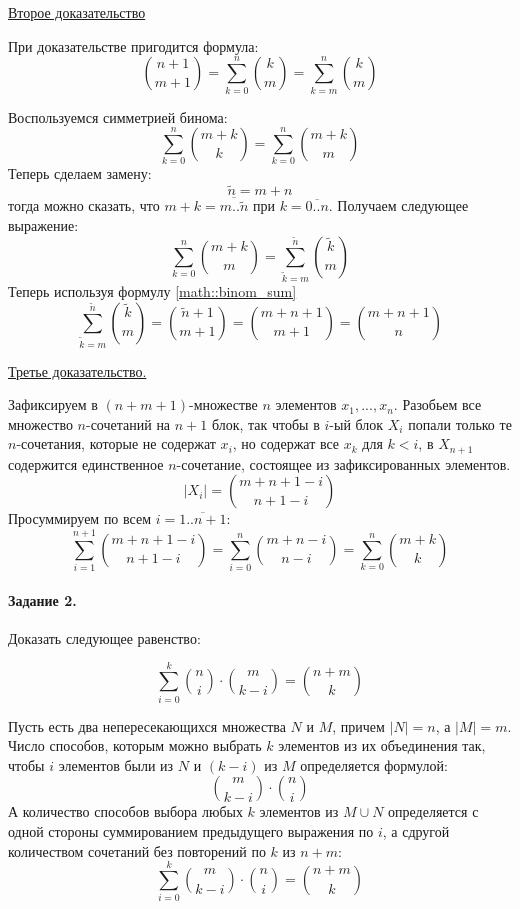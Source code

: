 \documentclass[a4paper,12pt]{article}
\begin{document}
\underline{Второе доказательство}

\begin{Proof}
	При доказательстве пригодится формула:
	\begin{equation}
		\binom{n+1}{m+1} = \sum_{k=0}^n \binom{k}{m} = \sum_{k=m}^{n} \binom{k}{m}
		\label{math::binom_sum}
	\end{equation}

	Воспользуемся симметрией бинома:
	\[
		\sum_{k=0}^n \binom{m+k}{k} = \sum_{k=0}^n \binom{m+k}{m}
	\]
	Теперь сделаем замену:
	\[\tilde n = m + n\] тогда можно сказать, что $m+k = \overline{m .. \tilde n}$ при $k = \overline{0 .. n}$. Получаем следующее выражение:
	\[
		\sum_{k=0}^n \binom{m+k}{m} = \sum_{\tilde k=m}^{\tilde n} \binom{\tilde k}{m}
	\]
	Теперь используя формулу \ref{math::binom_sum}
	\[
		\sum_{\tilde k=m}^{\tilde n} \binom{\tilde k}{m} = \binom{\tilde n + 1}{m + 1} = \binom{m + n + 1}{m + 1} = \binom{m+n+1}{n}
	\]
\end{Proof}

\underline{Третье доказательство.}

\begin{Proof}
	Зафиксируем в $(n+m+1)$-множестве $n$ элементов $x_1, ... , x_n$. Разобьем все множество $n$-сочетаний на $n+1$ блок, так чтобы в $i$-ый блок $X_i$ попали только те $n$-сочетания, которые не содержат $x_i$, но содержат все $x_k$ для $k<i$, в $X_{n+1}$ содержится единственное $n$-сочетание, состоящее из зафиксированных элементов.
	\[
		\left|X_i\right| = \binom{m+n+1-i}{n+1-i}
	\]
	Просуммируем по всем $i=\overline{1..n+1}$:
	\[
		\sum_{i=1}^{n+1} \binom{m+n+1-i}{n+1-i} = \sum_{i=0}^{n} \binom{m+n-i}{n-i} = \sum_{k=0}^{n} \binom{m+k}{k}
	\]
\end{Proof}

\paragraph{Задание 2.} Доказать следующее равенство:

\begin{equation}
	\sum_{i=0}^k \binom{n}{i} \cdot \binom{m}{k-i} = \binom{n+m}{k}
\end{equation}

\begin{Proof}
	Пусть есть два непересекающихся множества $N$ и $M$, причем $\left| N \right| = n$, а $ \left| M \right| = m $. Число способов, которым можно выбрать $k$ элементов из их объединения так, чтобы $i$ элементов были из $N$ и $(k-i)$ из $M$ определяется формулой:
	\[
		\binom{m}{k-i} \cdot \binom{n}{i}
	\]
	А количество способов выбора любых $k$ элементов из $M \cup N$ определяется с одной стороны суммированием предыдущего выражения по $i$, а сдругой количеством сочетаний без повторений по $k$ из $n+m$:
	\[
		\sum_{i=0}^k \binom{m}{k-i} \cdot \binom{n}{i} = \binom{n+m}{k}
	\]
\end{Proof}
\end{document}
